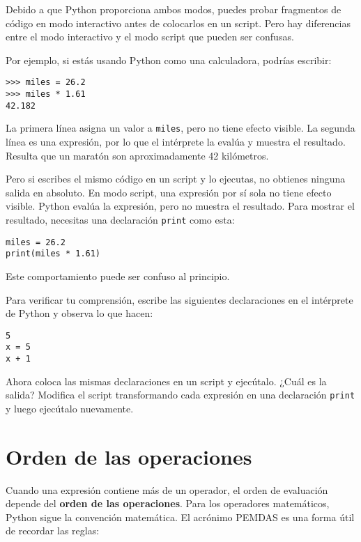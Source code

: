 Debido a que Python proporciona ambos modos, puedes probar fragmentos de código en modo interactivo antes de colocarlos en un script. Pero hay diferencias entre el modo interactivo y el modo script que pueden ser confusas.

Por ejemplo, si estás usando Python como una calculadora, podrías escribir:

\begin{lstlisting}
>>> miles = 26.2
>>> miles * 1.61
42.182
\end{lstlisting}

La primera línea asigna un valor a \texttt{miles}, pero no tiene efecto visible. La segunda línea es una expresión, por lo que el intérprete la evalúa y muestra el resultado. Resulta que un maratón son aproximadamente 42 kilómetros.

Pero si escribes el mismo código en un script y lo ejecutas, no obtienes ninguna salida en absoluto. En modo script, una expresión por sí sola no tiene efecto visible. Python evalúa la expresión, pero no muestra el resultado. Para mostrar el resultado, necesitas una declaración \texttt{print} como esta:

\begin{lstlisting}
miles = 26.2
print(miles * 1.61)
\end{lstlisting}

Este comportamiento puede ser confuso al principio.

Para verificar tu comprensión, escribe las siguientes declaraciones en el intérprete de Python y observa lo que hacen:

\begin{lstlisting}
5
x = 5
x + 1
\end{lstlisting}

Ahora coloca las mismas declaraciones en un script y ejecútalo. ¿Cuál es la salida? Modifica el script transformando cada expresión en una declaración \texttt{print} y luego ejecútalo nuevamente.

\section{Orden de las operaciones}

Cuando una expresión contiene más de un operador, el orden de evaluación depende del \textbf{orden de las operaciones}. Para los operadores matemáticos, Python sigue la convención matemática. El acrónimo PEMDAS es una forma útil de recordar las reglas:

